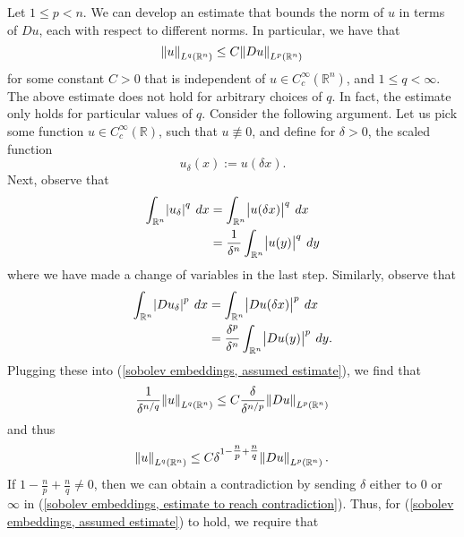 \documentclass[10pt]{article}
\begin{document}
Let $1 \leq p < n$. We can develop an estimate that bounds the norm of $u$ in terms of $Du$, each with respect to different norms. In particular, we have that 
\begin{equation}
	\label{sobolev embeddings, assumed estimate}
	\displaystyle \norm{u}_{L^q(\mathbb{R}^n)} \leq C\norm{Du}_{L^p(\mathbb{R}^n)}
\end{equation}
for some constant $C > 0$ that is independent of $u \in C^\infty_c(\mathbb{R}^n)$, and $1 \leq q < \infty$. The above estimate does not hold for arbitrary choices of $q$. In fact, the estimate only holds for particular values of $q$. Consider the following argument. Let us pick some function $u \in C^{\infty}_c(\mathbb{R})$, such that $u \not\equiv 0$, and define for $\delta > 0$, the scaled function
\begin{equation*}
	\displaystyle u_\delta(x) := u(\delta x).
\end{equation*}
Next, observe that 
\begin{align*}
	\displaystyle \int_{\mathbb{R}^n}{\abs{u_\delta}^q \: dx} &= \int_{\mathbb{R}^n}{\abs{u(\delta x)}^q \: dx} \\
	&= \frac{1}{\delta^n}\int_{\mathbb{R}^n}{\abs{u(y)}^q \: dy}
\end{align*}
where we have made a change of variables in the last step. Similarly, observe that 
\begin{align*}
	\displaystyle \int_{\mathbb{R}^n}{\abs{Du_\delta}^p \: dx} &= \int_{\mathbb{R}^n}{\abs{Du(\delta x)}^p \: dx} \\
	&= \frac{\delta^p}{\delta^n}\int_{\mathbb{R}^n}{\abs{Du(y)}^p \: dy}.
\end{align*}
Plugging these into (\ref{sobolev embeddings, assumed estimate}), we find that 
\begin{equation*}
	\displaystyle \frac{1}{\delta^{n/q}}\norm{u}_{L^q(\mathbb{R}^n)} \leq C\frac{\delta}{\delta^{n/p}}\norm{Du}_{L^p(\mathbb{R}^n)}
\end{equation*}
and thus 
\begin{equation}
	\label{sobolev embeddings, estimate to reach contradiction}
	\displaystyle \norm{u}_{L^q(\mathbb{R}^n)} \leq C\delta^{1-\tfrac{n}{p}+\tfrac{n}{q}}\norm{Du}_{L^p(\mathbb{R}^n)}.
\end{equation}
If $1 - \tfrac{n}{p} + \tfrac{n}{q} \neq 0$, then we can obtain a contradiction by sending $\delta$ either to $0$ or $\infty$ in (\ref{sobolev embeddings, estimate to reach contradiction}). Thus, for (\ref{sobolev embeddings, assumed estimate}) to hold, we require that 
\end{document}
